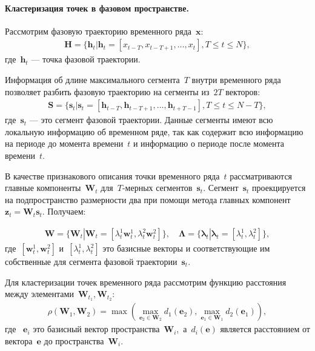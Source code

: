 \paragraph{Кластеризация точек в фазовом пространстве.}
Рассмотрим фазовую траекторию временного ряда~$\textbf{x}$:
\[
\label{eq:cl:1}
\begin{aligned}
\mathbf{H} = \{\textbf{h}_t| \textbf{h}_t = [x_{t-T}, x_{t-T+1}, \ldots, x_{t}], T\leq t\leq N\},
\end{aligned}
\]
где~$\textbf{h}_t$ --- точка фазовой траектории.

Информация об длине максимального сегмента~$T$ внутри временного ряда позволяет разбить фазовую траекторию на сегменты из~$2T$ векторов:
\[
\label{eq:cl:2}
\begin{aligned}
\mathbf{S} = \{\textbf{s}_t| \textbf{s}_t = [\textbf{h}_{t-T}, \textbf{h}_{t-T+1}, \ldots, \textbf{h}_{t+T-1}], T\leq t\leq N-T\},
\end{aligned}
\]
где~$\textbf{s}_t$ --- это сегмент фазовой траектории. Данные сегменты имеют всю локальную информацию об временном ряде, так как содержит всю информацию на периоде до момента времени~$t$ и информацию о периоде после момента времени~$t$.

В качестве признакового описания точки временного ряда~$t$ рассматриваются главные компоненты~$\textbf{W}_t$ для~$T\text{-мерных}$ сегментов~$\textbf{s}_t$. Сегмент~$\textbf{s}_t$ проекцируется на подпространство размерности два при помощи метода главных  компонент~$\textbf{z}_t = \textbf{W}_t\textbf{s}_t$. Получаем:

\[
\label{eq:cl:3}
\begin{aligned}
\mathbf{W} = \{\textbf{W}_t| \textbf{W}_t = [\lambda^1_t\textbf{w}^1_t, \lambda^2_t\textbf{w}^2_t]\}, \quad \bm{\Lambda} = \{\bm{\lambda}_t| \bm{\lambda}_t=[\lambda^1_t, \lambda^2_t]\},
\end{aligned}
\]
где~$[\textbf{w}^1_t, \textbf{w}^2_t]$ и~$[\lambda^1_t, \lambda^2_t]$ это базисные векторы и соответствующие им собственные для сегмента фазовой траектории~$\textbf{s}_t$.

Для кластеризации точек временного ряда рассмотрим функцию расстояния между элементами~$\mathbf{W}_{t_1},\mathbf{W}_{t_2}$:
\[
\label{eq:cl:4}
\begin{aligned}
\rho\left(\textbf{W}_1, \textbf{W}_2\right) = \max\left(\max_{\textbf{e}_2 \in \textbf{W}_2} d_{1}\left(\textbf{e}_2\right), \max_{\textbf{e}_1 \in \textbf{W}_1} d_{2}\left(\textbf{e}_1\right)\right),
\end{aligned}
\]
где ~$\textbf{e}_i$ это базисный вектор пространства~$\textbf{W}_i,$ а~$d_i\left(\textbf{e}\right)$ является расстоянием от вектора~$\textbf{e}$ до пространства~$\textbf{W}_i$.

